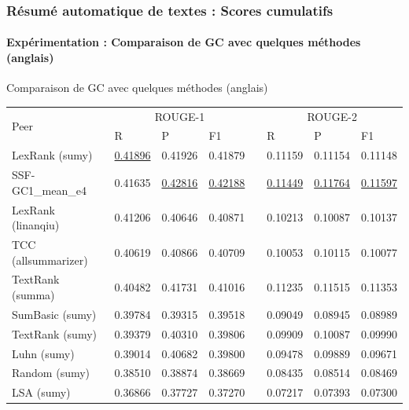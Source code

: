 \documentclass[xcolor=table]{beamer}
\begin{document}
\begin{frame}
\frametitle{Résumé automatique de textes : Scores cumulatifs}
\framesubtitle{Expérimentation : Comparaison de GC avec quelques méthodes (anglais)}
	
\begin{block}{Comparaison de GC avec quelques méthodes (anglais)}
	\centering\scriptsize
	\begin{tabular}{llllllll}
		\hline\hline
		
		\multirow{2}{*}{Peer} & \multicolumn{3}{c}{ROUGE-1}  &&  \multicolumn{3}{c}{ROUGE-2}  \\
		\cline{2-4} \cline{6-8}\noalign{\smallskip}
		& R & P & F1 && R & P & F1 \\
		
		\hline
		
		LexRank (sumy) & \underline{\color{red}0.41896} & 0.41926 & 0.41879 && 0.11159 & 0.11154 & 0.11148 \\
		SSF-GC1\_mean\_e4 &  0.41635  & \underline{\color{red}0.42816}  & \underline{\color{red}0.42188}  && \underline{\color{red}0.11449}  & \underline{\color{red}0.11764}  & \underline{\color{red}0.11597}\\
		LexRank (linanqiu) & 0.41206 & 0.40646 & 0.40871 && 0.10213 & 0.10087 & 0.10137 \\
		TCC (allsummarizer) & 0.40619 & 0.40866 & 0.40709 && 0.10053 & 0.10115 & 0.10077 \\
		TextRank (summa) & 0.40482 & 0.41731 & 0.41016 && 0.11235 & 0.11515 & 0.11353 \\
		SumBasic (sumy) & 0.39784 & 0.39315 & 0.39518 && 0.09049 & 0.08945 & 0.08989 \\
		TextRank (sumy) & 0.39379 & 0.40310 & 0.39806 && 0.09909 & 0.10087 & 0.09990 \\
		Luhn (sumy) & 0.39014 & 0.40682 & 0.39800 && 0.09478 & 0.09889 & 0.09671 \\
		Random (sumy) & 0.38510 & 0.38874 & 0.38669 && 0.08435 & 0.08514 & 0.08469 \\
		LSA (sumy) & 0.36866 & 0.37727 & 0.37270 && 0.07217 & 0.07393 & 0.07300 \\
		\hline\hline
	\end{tabular} 
\end{block}
	
\end{frame}

%
\end{document}
